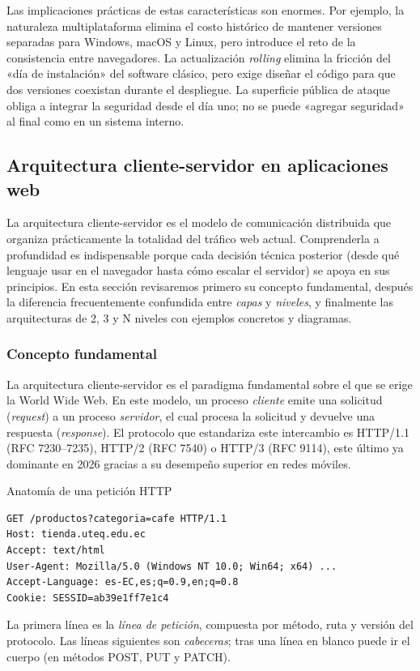 Las implicaciones prácticas de estas características son enormes. Por
ejemplo, la naturaleza multiplataforma elimina el costo histórico de
mantener versiones separadas para Windows, macOS y Linux, pero
introduce el reto de la consistencia entre navegadores. La actualización
\emph{rolling} elimina la fricción del «día de instalación» del
software clásico, pero exige diseñar el código para que dos versiones
coexistan durante el despliegue. La superficie pública de ataque obliga
a integrar la seguridad desde el día uno; no se puede «agregar
seguridad» al final como en un sistema interno.

\subsection{Arquitectura cliente-servidor en aplicaciones web}

La arquitectura cliente-servidor es el modelo de comunicación
distribuida que organiza prácticamente la totalidad del tráfico web
actual. Comprenderla a profundidad es indispensable porque cada
decisión técnica posterior (desde qué lenguaje usar en el navegador
hasta cómo escalar el servidor) se apoya en sus principios. En esta
sección revisaremos primero su concepto fundamental, después la
diferencia frecuentemente confundida entre \emph{capas} y
\emph{niveles}, y finalmente las arquitecturas de 2, 3 y N niveles
con ejemplos concretos y diagramas.

\subsubsection{Concepto fundamental}

La arquitectura cliente-servidor es el paradigma fundamental sobre el
que se erige la World Wide Web. En este modelo, un proceso
\emph{cliente} emite una solicitud (\emph{request}) a un proceso
\emph{servidor}, el cual procesa la solicitud y devuelve una respuesta
(\emph{response}). El protocolo que estandariza este intercambio es
HTTP/1.1 (RFC 7230--7235), HTTP/2 (RFC 7540) o HTTP/3 (RFC 9114), este
último ya dominante en 2026 gracias a su desempeño superior en redes
móviles.

\begin{cajadefinicion}{Anatomía de una petición HTTP}
\begin{lstlisting}[style=shell,numbers=none,caption={Ejemplo de Shell},label=lst:1.1]
GET /productos?categoria=cafe HTTP/1.1
Host: tienda.uteq.edu.ec
Accept: text/html
User-Agent: Mozilla/5.0 (Windows NT 10.0; Win64; x64) ...
Accept-Language: es-EC,es;q=0.9,en;q=0.8
Cookie: SESSID=ab39e1ff7e1c4
\end{lstlisting}
La primera línea es la \emph{línea de petición}, compuesta por método,
ruta y versión del protocolo. Las líneas siguientes son
\emph{cabeceras}; tras una línea en blanco puede ir el cuerpo (en
métodos POST, PUT y PATCH).
\end{cajadefinicion}


